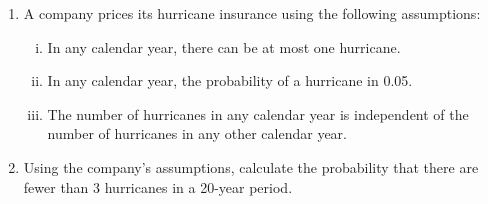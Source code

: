 \documentclass{article}
\begin{document}
\begin{enumerate}
    \item A company prices its hurricane insurance using the following assumptions:%
    \begin{enumerate}[(i)]
        \item In any calendar year, there can be at most one hurricane.
        \item In any calendar year, the probability of a hurricane in 0.05.
        \item The number of hurricanes in any calendar year is independent of the number of hurricanes in any other calendar year.
    \end{enumerate}
    \item[] Using the company's assumptions, calculate the probability that there are fewer than 3 hurricanes in a 20-year period.\vspace{100pt}
\end{enumerate}
\end{document}
